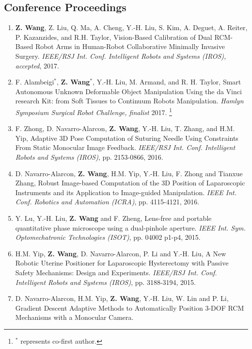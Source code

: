 \documentclass[10pt,letterpaper]{article}
\begin{document}
    \subsection*{Conference Proceedings}
    \begin{enumerate}
        \item \textbf{Z. Wang}, Z. Liu, Q. Ma, A. Cheng, Y.-H. Liu, S. Kim, A. Deguet, A. Reiter, P. Kazanzides, and R.H. Taylor,
        Vision-Based Calibration of Dual RCM-Based Robot Arms in Human-Robot Collaborative Minimally Invasive Surgery.
        \textit{{IEEE/RSJ} Int. Conf. Intelligent Robots and Systems (IROS), accepted}, 2017.
        \item F. Alambeigi$^*$, \textbf{Z. Wang}$^*$, Y.-H. Liu, M. Armand, and R. H. Taylor,
        Smart Autonomous Unknown Deformable Object Manipulation Using the da Vinci research Kit: from Soft Tissues to Continuum Robots Manipulation.
        \textit{Hamlyn Symposium Surgical Robot Challenge, finalist} 2017.
        \let\thefootnote\relax\footnote{$^*$ represents co-first author.}
        \item F. Zhong, D. Navarro-Alarcon, \textbf{Z. Wang}, Y.-H. Liu, T. Zhang, and H.M. Yip,
        Adaptive 3D Pose Computation of Suturing Needle Using Constraints From Static Monocular Image Feedback.
        \textit{{IEEE/RSJ} Int. Conf. Intelligent Robots and Systems (IROS)}, pp. 2153-0866, 2016.
        \item D. Navarro-Alarcon, \textbf{Z. Wang}, H.M. Yip, Y.-H. Liu, F. Zhong and Tianxue Zhang,
        Robust Image-based Computation of the 3D Position of Laparoscopic Instruments and its Application to Image-guided Manipulation.
        \textit{{IEEE} Int. Conf. Robotics and Automation (ICRA)}, pp. 4115-4121, 2016.
        \item Y. Lu, Y.-H. Liu, \textbf{Z. Wang} and F. Zheng,
        Lens-free and portable quantitative phase microscope using a dual-pinhole aperture.
        \textit{{IEEE} Int. Sym. Optomechatronic Technologies (ISOT)}, pp. 04002 p1-p4, 2015.
        \item H.M. Yip, \textbf{Z. Wang}, D. Navarro-Alarcon, P. Li and Y.-H. Liu,
        A New Robotic Uterine Positioner for Laparoscopic Hysterectomy with Passive Safety Mechanisms: Design and Experiments.
        \textit{{IEEE/RSJ} Int. Conf. Intelligent Robots and Systems (IROS)}, pp. 3188-3194, 2015.
        \item D. Navarro-Alarcon, H.M. Yip, \textbf{Z. Wang}, Y.-H. Liu, W. Lin and P. Li,
        Gradient Descent Adaptive Methods to Automatically Position 3-DOF RCM Mechanisms with a Monocular Camera.

\end{enumerate}
\end{document}
